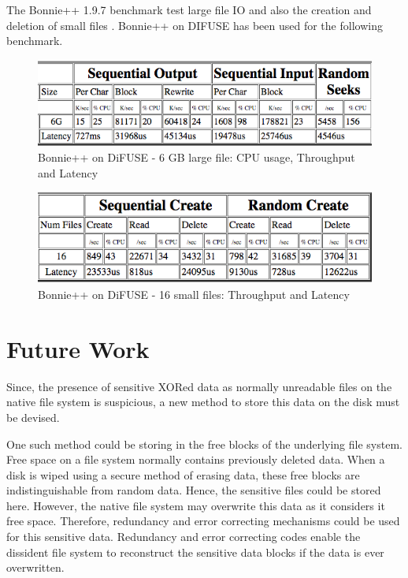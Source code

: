 \documentclass[10pt,twocolumn]{article}
\begin{document}
The Bonnie++ 1.9.7 benchmark test large file IO and also the creation and deletion of small files \cite{bonnie}. Bonnie++ on DIFUSE has been used for the following benchmark. 
\begin{figure}[thpb]
  \centering
  	\includegraphics[width=\columnwidth]{bonnie1}
    \caption{Bonnie++ on DiFUSE - 6 GB large file: CPU usage, Throughput and Latency}
	\label{fig:bonnie1}
\end{figure}

\begin{figure}[thpb]
  \centering
  	\includegraphics[width=\columnwidth]{bonnie2}
    \caption{Bonnie++ on DiFUSE - 16 small files: Throughput and Latency}
	\label{fig:bonnie2}
\end{figure}

\section{Future Work}

Since, the presence of sensitive XORed data as normally unreadable files on the native file system is suspicious, a new method to store this data on the disk must be devised. 

One such method could be storing in the free blocks of the underlying file system. Free space on a file system normally contains previously deleted data. When a disk is wiped using a secure method of erasing data, these free blocks are indistinguishable from random data. Hence, the sensitive files could be stored here. However, the native file system may overwrite this data as it considers it free space. Therefore, redundancy and error correcting mechanisms could be used for this sensitive data. Redundancy and error correcting codes enable the dissident file system to reconstruct the sensitive data blocks if the data is ever overwritten. 
\end{document}
